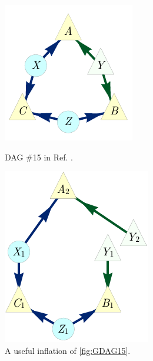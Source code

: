 \documentclass[aps,english,superscriptaddress,onecolumn,twoside,longbibliography,pra,floatfix,fleqn,nofootinbib]{revtex4-1}%
\theoremstyle{definition}
\begin{document}
\begin{figure}[b]
\centering
\begin{minipage}[t]{0.4\linewidth}
\centering
\includegraphics[scale=1]{scen15DAGV3.pdf}
\caption{DAG \#15 in Ref. \cite{pusey2014gdag}.}\label{fig:GDAG15}
\end{minipage}
\hfill
\begin{minipage}[t]{0.5\linewidth}
\centering
\includegraphics[scale=1]{scen15InflationDAGV3.pdf}
\caption{A useful inflation of \cref{fig:GDAG15}.}\label{fig:Inflated15}
\end{minipage}
\end{figure}
\end{document}
